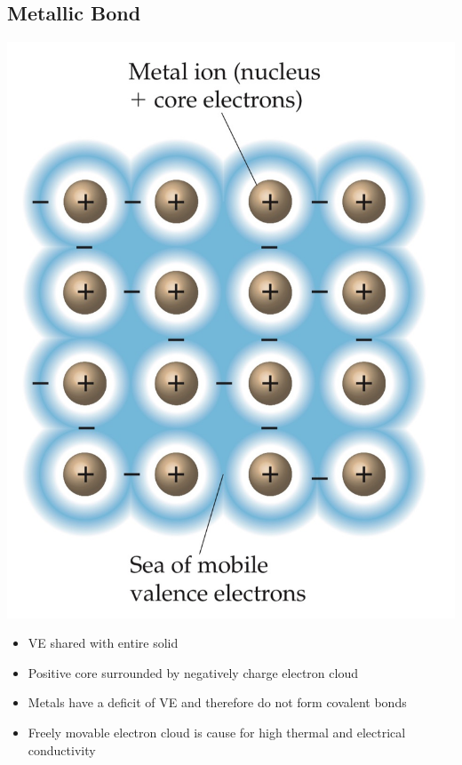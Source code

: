 \subsection{Metallic Bond}
\begin{minipage}{0.4\linewidth}
    \begin{center}
        \includegraphics[width = 0.7\linewidth]{images/Metallic_Bond.jpeg}
    \end{center}
\end{minipage}
\begin{minipage}{0.59\linewidth}
\begin{itemize}[leftmargin=0.20cm, itemsep=0.05pt]
    \item VE shared with entire solid
    \item Positive core surrounded by negatively charge electron cloud
    \item  Metals have a deficit of VE and therefore do not form covalent bonds
    \item Freely movable electron cloud is cause for high thermal and electrical conductivity
\end{itemize}
\end{minipage}